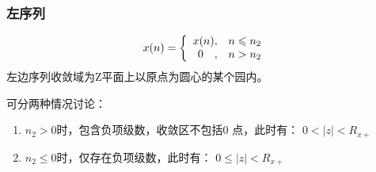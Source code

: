 \documentclass[notheorems,compress,mathserif,table]{beamer}
\begin{document}
\begin{frame}[shrink]\frametitle{左序列}%
\begin{equation*}
x(n) = \left\{
\begin{array}
{r@{,\quad}l}
x(n)    & n \leqslant n_2 \\
0\quad  & n > n_2
\end{array} \right.
\end{equation*}
左边序列收敛域为Z平面上以原点为圆心的某个园内。\par
可分两种情况讨论：
\begin{enumerate}
\item $n_2>0$时，包含负项级数，收敛区不包括$0$ 点，此时有： \quad $0 <|z| < R_{x+}$
\item $n_2\leqslant0$时，仅存在负项级数，此时有： \quad $0 \leqslant|z| <R_{x+}$
\end{enumerate}
\end{frame}
\end{document}
